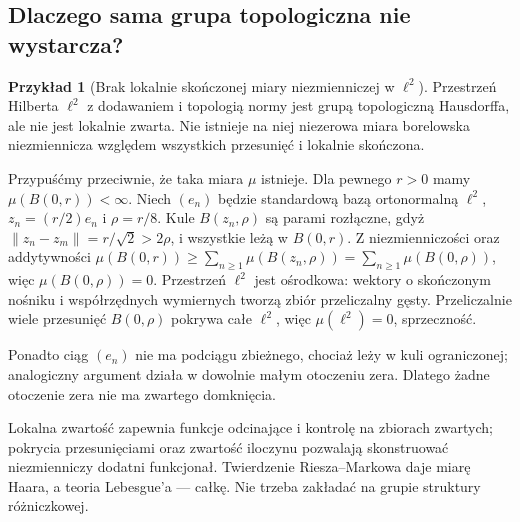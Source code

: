 \documentclass[11pt,a4paper]{article}
\numberwithin{equation}{section}
\theoremstyle{plain}
\theoremstyle{definition}
\newtheorem{przyklad}[twierdzenie]{Przykład}
\theoremstyle{remark}
\begin{document}
\subsection*{Dlaczego sama grupa topologiczna nie wystarcza?}
\begin{przyklad}[Brak lokalnie skończonej miary niezmienniczej w $\ell^2$]
Przestrzeń Hilberta $\ell^2$ z dodawaniem i topologią normy jest grupą topologiczną Hausdorffa, ale nie jest lokalnie zwarta. Nie istnieje na niej niezerowa miara borelowska niezmiennicza względem wszystkich przesunięć i lokalnie skończona.

Przypuśćmy przeciwnie, że taka miara $\mu$ istnieje. Dla pewnego $r>0$ mamy $\mu(B(0,r))<\infty$. Niech $(e_n)$ będzie standardową bazą ortonormalną $\ell^2$, $z_n=(r/2)e_n$ i $\rho=r/8$. Kule $B(z_n,\rho)$ są parami rozłączne, gdyż $\|z_n-z_m\|=r/\sqrt2>2\rho$, i wszystkie leżą w $B(0,r)$. Z niezmienniczości oraz addytywności
$\mu(B(0,r))\ge\sum_{n\ge1}\mu(B(z_n,\rho))=\sum_{n\ge1}\mu(B(0,\rho))$, więc $\mu(B(0,\rho))=0$. Przestrzeń $\ell^2$ jest ośrodkowa: wektory o skończonym nośniku i współrzędnych wymiernych tworzą zbiór przeliczalny gęsty. Przeliczalnie wiele przesunięć $B(0,\rho)$ pokrywa całe $\ell^2$, więc $\mu(\ell^2)=0$, sprzeczność.

Ponadto ciąg $(e_n)$ nie ma podciągu zbieżnego, chociaż leży w kuli ograniczonej; analogiczny argument działa w dowolnie małym otoczeniu zera. Dlatego żadne otoczenie zera nie ma zwartego domknięcia.
\end{przyklad}
Lokalna zwartość zapewnia funkcje odcinające i kontrolę na zbiorach zwartych; pokrycia przesunięciami oraz zwartość iloczynu pozwalają skonstruować niezmienniczy dodatni funkcjonał. Twierdzenie Riesza--Markowa daje miarę Haara, a teoria Lebesgue'a --- całkę. Nie trzeba zakładać na grupie struktury różniczkowej.

\end{document}
